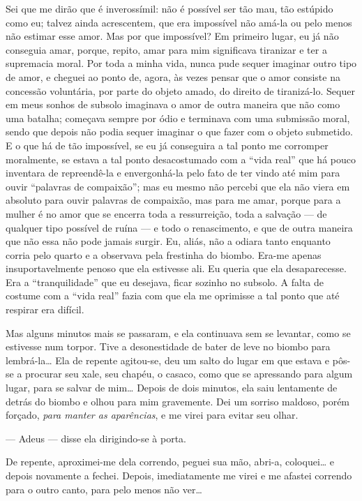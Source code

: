 Sei que me dirão que é inverossímil: não é possível ser tão mau, tão
estúpido como eu; talvez ainda acrescentem, que era impossível não
amá-la ou pelo menos não estimar esse amor. Mas por que impossível? Em
primeiro lugar, eu já não conseguia amar, porque, repito, amar para mim
significava tiranizar e ter a supremacia moral. Por toda a minha vida,
nunca pude sequer imaginar outro tipo de amor, e cheguei ao ponto de,
agora, às vezes pensar que o amor consiste na concessão voluntária, por
parte do objeto amado, do direito de tiranizá-lo. Sequer em meus sonhos
de subsolo imaginava o amor de outra maneira que não como uma batalha;
começava sempre por ódio e terminava com uma submissão moral, sendo que
depois não podia sequer imaginar o que fazer com o objeto submetido. E
o que há de tão impossível, se eu já conseguira a tal ponto me
corromper moralmente, se estava a tal ponto desacostumado com a “vida
real” que há pouco inventara de repreendê-la e envergonhá-la pelo fato
de ter vindo até mim para ouvir “palavras de compaixão”; mas eu mesmo
não percebi que ela não viera em absoluto para ouvir palavras de
compaixão, mas para me amar, porque para a mulher é no amor que se
encerra toda a ressurreição, toda a salvação --- de qualquer tipo
possível de ruína --- e todo o renascimento, e que de outra maneira que
não essa não pode jamais surgir. Eu, aliás, não a odiara tanto enquanto
corria pelo quarto e a observava pela frestinha do biombo. Era-me
apenas insuportavelmente penoso que ela estivesse ali. Eu queria que
ela desaparecesse. Era a “tranquilidade” que eu desejava, ficar sozinho
no subsolo. A falta de costume com a “vida real” fazia com que ela me
oprimisse a tal ponto que até respirar era difícil.

Mas alguns minutos mais se passaram, e ela continuava sem se levantar, como se
estivesse num torpor. Tive a desonestidade de bater de leve no biombo para
lembrá-la\ldots{} Ela de repente agitou-se, deu um salto do lugar em que estava
e pôs-se a procurar seu xale, seu chapéu, o casaco, como que se apressando para
algum lugar, para se salvar de mim\ldots{} Depois de dois minutos, ela saiu
lentamente de detrás do biombo e olhou para mim gravemente. Dei um sorriso
maldoso, porém forçado, \textit{para manter as aparências}, e me virei para
evitar seu olhar.

--- Adeus --- disse ela dirigindo-se à porta.

De repente, aproximei-me dela correndo, peguei sua mão, abri-a,
coloquei\ldots{} e depois novamente a fechei. Depois, imediatamente me virei
e me afastei correndo para o outro canto, para pelo menos não ver\ldots{}

